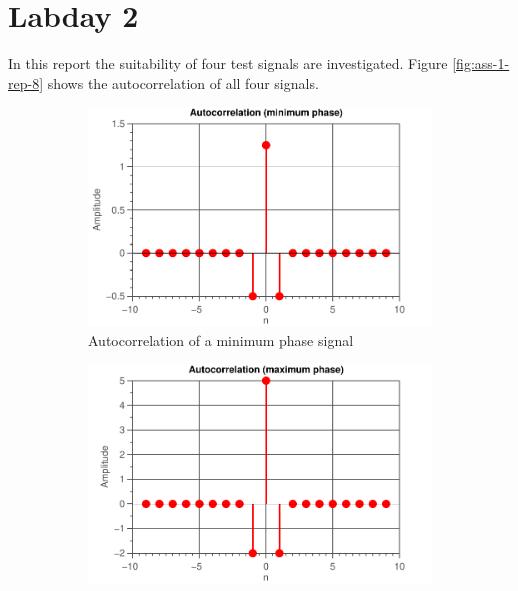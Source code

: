 \documentclass[11pt,titlepage]{report}
\begin{document}
\section{Labday 2}
In this report the suitability of four test signals are investigated. Figure \ref{fig:ass-1-rep-8} shows the autocorrelation of all four signals.

\begin{figure}[H]
	\centering
	\begin{subfigure}{0.49\textwidth}
		\includegraphics[width=\textwidth]{../../deliverable-7-resources/figures/ass-1/report-8-9-10/report-8/ass-1-report-8-minimum-phase-minimum-phase.pdf}
		\caption{Autocorrelation of a minimum phase signal}
	\end{subfigure}
	\begin{subfigure}{0.49\textwidth}
		\includegraphics[width=\textwidth]{../../deliverable-7-resources/figures/ass-1/report-8-9-10/report-8/ass-1-report-8-maximum-phase-maximum-phase.pdf}

\end{subfigure}
\end{figure}
\end{document}
